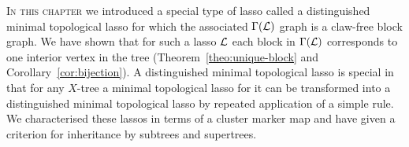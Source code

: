\textsc{In this chapter} we introduced a special type of lasso called a
distinguished minimal topological lasso for which the associated $\Gamma({\mathcal L})$
graph is a claw-free block graph.  We have shown that for such a lasso ${\mathcal L}$
each block in $\Gamma({\mathcal L})$ corresponds to one interior vertex in the tree
(Theorem~\ref{theo:unique-block} and Corollary~\ref{cor:bijection}).  A
distinguished minimal topological lasso is special in that for any $X$-tree a
minimal topological lasso for it can be transformed into a distinguished
minimal topological lasso by repeated application of a simple rule.  We
characterised these lassos in terms of a cluster marker map and have given a
criterion for inheritance by subtrees and supertrees.

